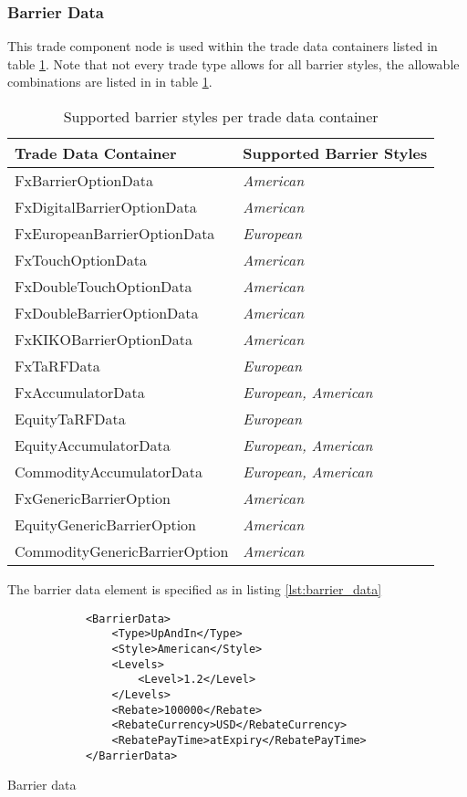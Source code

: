 \subsubsection{Barrier Data}
\label{ss:barrier_data} 

This trade component node is used within the trade data containers listed in table \ref{tab:barrierstyles}. Note that not
every trade type allows for all barrier styles, the allowable combinations are listed in in table \ref{tab:barrierstyles}.

\begin{table}
  \centering
  \begin{tabular}{l | l}
    Trade Data Container & Supported Barrier Styles \\ \hline
    FxBarrierOptionData & \emph{American} \\
    FxDigitalBarrierOptionData & \emph{American} \\
    FxEuropeanBarrierOptionData & \emph{European} \\
    FxTouchOptionData & \emph{American} \\
    FxDoubleTouchOptionData & \emph{American} \\
    FxDoubleBarrierOptionData & \emph{American} \\
    FxKIKOBarrierOptionData & \emph{American} \\
    FxTaRFData & \emph{European} \\
    FxAccumulatorData & \emph{European, American} \\
    EquityTaRFData & \emph{European} \\
    EquityAccumulatorData & \emph{European, American} \\
    CommodityAccumulatorData & \emph{European, American} \\
    FxGenericBarrierOption & \emph{American} \\
    EquityGenericBarrierOption & \emph{American} \\
    CommodityGenericBarrierOption & \emph{American}
\end{tabular}
  \caption{Supported barrier styles per trade data container}
  \label{tab:barrierstyles}
\end{table}

The barrier data element is specified as in listing \ref{lst:barrier_data}

\begin{listing}[H]
\begin{verbatim}
            <BarrierData>
                <Type>UpAndIn</Type>
                <Style>American</Style>
                <Levels>
                    <Level>1.2</Level>
                </Levels>
                <Rebate>100000</Rebate>
                <RebateCurrency>USD</RebateCurrency>
                <RebatePayTime>atExpiry</RebatePayTime>
            </BarrierData>
\end{verbatim}
\caption{Barrier data}
\label{lst:barrier_data}
\end{listing}

